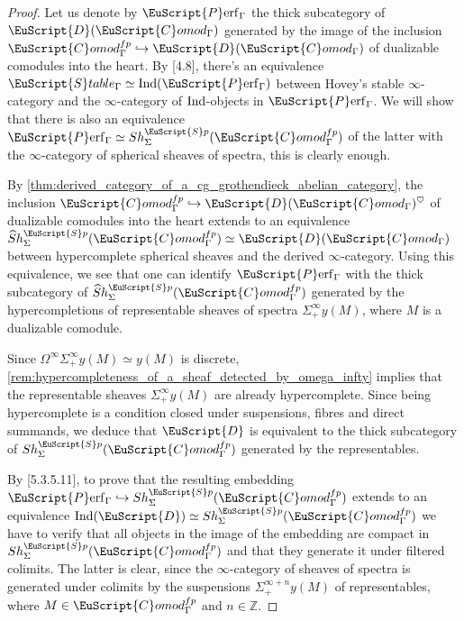 \documentclass[oneside,a4paper]{amsart}
\newcommand{\euscr}[1]{\EuScript{#1}} %
\newcommand{\dcat}{\euscr{D}} %
\newcommand{\Ind}{\textnormal{Ind}} %
\newcommand{\spectra}{\euscr{S}p} %
\newcommand{\hpsheaves}{\widehat{S}h} %
\newcommand{\Comod}{\euscr{C}omod} %
\newcommand{\ComodGamma}{\Comod_{\Gamma}} %
\newcommand{\sigmainfty}{\Sigma^{\infty}_{+}} %
\newcommand{\omegainfty}{\Omega^{\infty}} %
\newcommand{\Perf}{\euscr{P}\mathrm{erf}} %
\theoremstyle{plain}
\theoremstyle{definition}
\theoremstyle{remark}
\begin{document}
\begin{proof}
Let us denote by $\Perf_{\Gamma}$ the thick subcategory of $\dcat(\ComodGamma)$ generated by the image of the inclusion $\ComodGamma^{fp} \hookrightarrow \dcat(\ComodGamma)$ of dualizable comodules into the heart. By \cite{barthel2015local}[4.8], there's an equivalence $\euscr{S}table_{\Gamma} \simeq \Ind(\Perf_{\Gamma})$ between Hovey's stable $\infty$-category and the $\infty$-category of $\Ind$-objects in $\Perf_{\Gamma}$. We will show that there is also an equivalence $\Perf_{\Gamma} \simeq Sh_{\Sigma}^{\spectra}(\ComodGamma^{fp})$ of the latter with the $\infty$-category of spherical sheaves of spectra, this is clearly enough.

By \cref{thm:derived_category_of_a_cg_grothendieck_abelian_category}, the inclusion $\ComodGamma^{fp} \hookrightarrow \dcat(\ComodGamma)^{\heartsuit}$ of dualizable comodules into the heart extends to an equivalence $\hpsheaves_{\Sigma}^{\spectra}(\ComodGamma^{fp}) \simeq \dcat(\ComodGamma)$ between hypercomplete spherical sheaves and the derived $\infty$-category. Using this equivalence, we see that one can identify $\Perf_{\Gamma}$ with the thick subcategory of $\hpsheaves_{\Sigma}^{\spectra}(\ComodGamma^{fp})$ generated by the hypercompletions of representable sheaves of spectra $\sigmainfty y(M)$, where $M$ is a dualizable comodule.  

Since $\omegainfty \sigmainfty y(M) \simeq y(M)$ is discrete, \cref{rem:hypercompleteness_of_a_sheaf_detected_by_omega_infty} implies that the representable sheaves $\sigmainfty y(M)$ are already hypercomplete. Since being hypercomplete is a condition closed under suspensions, fibres and direct summands, we deduce that $\dcat$ is equivalent to the thick subcategory of $Sh_{\Sigma}^{\spectra}(\ComodGamma^{fp})$ generated by the representables. 

By \cite{lurie_higher_topos_theory}[5.3.5.11], to prove that the resulting embedding $\Perf_{\Gamma} \hookrightarrow Sh_{\Sigma}^{\spectra}(\ComodGamma^{fp})$ extends to an equivalence $\Ind(\dcat) \simeq Sh_{\Sigma}^{\spectra}(\ComodGamma^{fp})$ we have to verify that all objects in the image of the embedding are compact in $Sh_{\Sigma}^{\spectra}(\ComodGamma^{fp})$ and that they generate it under filtered colimits. The latter is clear, since the $\infty$-category of sheaves of spectra is generated under colimits by the suspensions $\Sigma^{\infty+n}_{+} y(M)$ of representables, where $M \in \ComodGamma^{fp}$ and $n \in \mathbb{Z}$. 


\end{proof}
\end{document}
